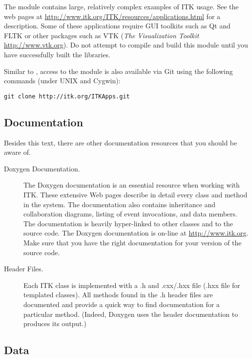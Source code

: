 The  module contains large, relatively complex
examples of ITK usage. See the web pages at
\url{http://www.itk.org/ITK/resources/applications.html} for a description. Some of
these applications require GUI toolkits such as Qt and FLTK or other packages
such as VTK (\emph{The Visualization Toolkit}
\url{http://www.vtk.org}). Do not attempt to compile and build this module
until you have successfully built the  libraries.

Similar to , access to
the  module is also available via Git using the
following commands (under UNIX and Cygwin):
\begin{verbatim}
git clone http://itk.org/ITKApps.git
\end{verbatim}

\subsection{Documentation}
\label{sec:Documentation}

Besides this text, there are other documentation resources that you should be
aware of.
\begin{description}
        \item[Doxygen Documentation.] The Doxygen documentation is an
        essential resource when working with ITK. These extensive Web pages
        describe in detail every class and method in the system. The
        documentation also contains inheritance and collaboration diagrams,
        listing of event invocations, and data members. The documentation is
        heavily hyper-linked to other classes and to the source code. The
        Doxygen documentation is on-line at
        \url{http://www.itk.org}. Make sure that you have the right documentation
        for your version of the source code.

	\item[Header Files.] Each ITK class is implemented with a .h and
        .cxx/.hxx file (.hxx file for templated classes). All methods
        found in the .h header files are documented and provide a quick way
        to find documentation for a particular method. (Indeed, Doxygen uses
        the header documentation to produces its output.)
\end{description}

\subsection{Data}
\label{sec:Data}

